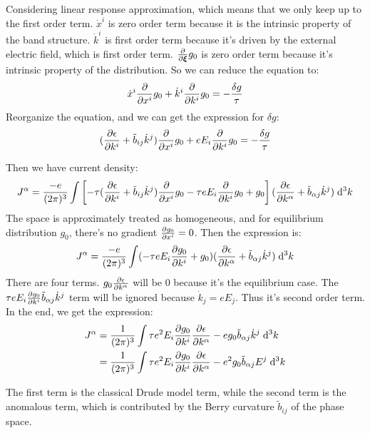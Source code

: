 \documentclass[../main.tex]{subfiles}
\begin{document}
Considering linear response approximation, which means that we only keep up to the first order term. $\dot{x}^i$ is zero order term because it is the intrinsic property of the band structure. $\dot{k}^i$ is first order term because it's driven by the external electric field, which is first order term. $\pdv{\bm{\xi}} g_0$ is zero order term because it's intrinsic property of the distribution. So we can reduce the equation to:
\begin{equation}
    \dot{x}^i\pdv{x^i}g_0 + \dot{k}^i\pdv{k^i}g_0 = -\frac{\delta g}{\tau}
\end{equation} 
Reorganize the equation, and we can get the expression for $\delta g$:
\begin{equation}
    (\pdv{\epsilon}{k^i} + \tilde{b}_{ij} \dot{k}^j)\pdv{x^i}g_0 +  eE_i \pdv{k^i}g_0 = -\frac{\delta g}{\tau}
\end{equation}

Then we have current density:
\begin{equation}
    J^\alpha =  \frac{-e}{(2\pi)^3} \int \left[-\tau(\pdv{\epsilon}{k^i} + \tilde{b}_{ij} \dot{k}^j)\pdv{x^i}g_0   - \tau eE_i\pdv{k^i}g_0 + g_0\right](\pdv{\epsilon}{k^\alpha} + \tilde{b}_{\alpha j} \dot{k}^j) \;\dd^3{k}
\end{equation}
The space is approximately treated as homogeneous, and for equilibrium distribution $g_0$, there's no gradient $\pdv{g_0}{x^i} = 0$. Then the expression is:
\begin{equation}
    J^\alpha = \frac{-e}{(2\pi)^3} \int ( - \tau eE_i\pdv{g_0}{k^i} + g_0)(\pdv{\epsilon}{k^\alpha} + \tilde{b}_{\alpha j} \dot{k}^j) \;\dd^3{k}
\end{equation}
There are four terms. $g_0 \pdv{\epsilon}{k^\alpha}$ will be $0$ because it's the equilibrium case. The $\tau eE_i\pdv{g_0}{k^i} \tilde{b}_{\alpha j} \dot{k}^j$ term will be ignored because $\dot{k}_j = eE_j$. Thus it's second order term. In the end, we get the expression:
\begin{align}
    J^\alpha &= \frac{1}{(2\pi)^3}\int \tau e^2 E_i \pdv{g_0}{k^i}\pdv{\epsilon}{k^\alpha} - e g_0 \tilde{b}_{\alpha j} \dot{k}^j\;\dd^3{k}\nonumber\\ 
    &= \frac{1}{(2\pi)^3}\int \tau e^2 E_i \pdv{g_0}{k^i}\pdv{\epsilon}{k^\alpha} - e^2 g_0 \tilde{b}_{\alpha j} E^j\;\dd^3{k}
\end{align}

The first term is the classical Drude model term, while the second term is the anomalous term, which is contributed by the Berry curvature $\tilde{b}_{ij}$ of the phase space.
\end{document}
